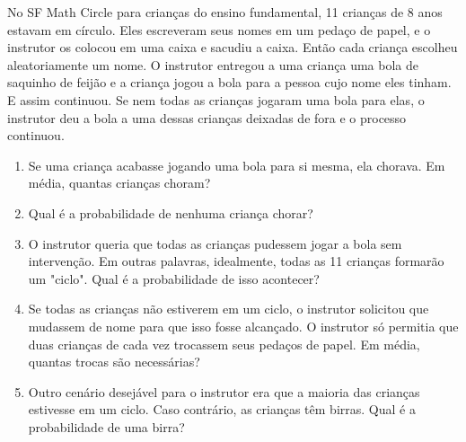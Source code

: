 \documentclass[10pt, a4paper]{article}
\begin{document}
	\begin{prob}
		No SF Math Circle para crianças do ensino fundamental, 11 crianças de 8 anos estavam em círculo. Eles escreveram seus nomes em um pedaço de papel, e o instrutor os colocou em uma caixa e sacudiu a caixa. Então cada criança escolheu aleatoriamente um nome. O instrutor entregou a uma criança uma bola de saquinho de feijão e a criança jogou a bola para a pessoa cujo nome eles tinham. E assim continuou. Se nem todas as crianças jogaram uma bola para elas, o instrutor deu a bola a uma dessas crianças deixadas de fora e o processo continuou.
		\begin{enumerate}[label = (\alph*)]
			\item Se uma criança acabasse jogando uma bola para si mesma, ela chorava. Em média, quantas crianças choram?
			\item Qual é a probabilidade de nenhuma criança chorar?
			\item O instrutor queria que todas as crianças pudessem jogar a bola sem intervenção. Em outras palavras, idealmente, todas as 11 crianças formarão um "ciclo". Qual é a probabilidade de isso acontecer?
			\item Se todas as crianças não estiverem em um ciclo, o instrutor solicitou que mudassem de nome para que isso fosse alcançado. O instrutor só permitia que duas crianças de cada vez trocassem seus pedaços de papel. Em média, quantas trocas são necessárias?
			\item Outro cenário desejável para o instrutor era que a maioria das crianças estivesse em um ciclo. Caso contrário, as crianças têm birras. Qual é a probabilidade de uma birra?
		\end{enumerate}
	\end{prob}
\end{document}
